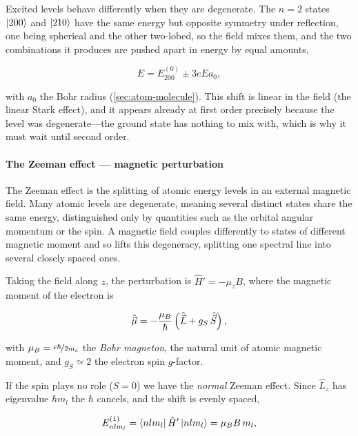     Excited levels behave differently when they are degenerate. The $n=2$ states $\ket{200}$ and $\ket{210}$ have the same energy but opposite symmetry under reflection, one being spherical and the other two-lobed, so the field mixes them, and the two combinations it produces are pushed apart in energy by equal amounts,

    \begin{equation*}
        E = E^{(0)}_{200} \pm 3eEa_{0},
    \end{equation*}

    with $a_{0}$ the Bohr radius (\cref{sec:atom-molecule}). This shift is linear in the field (the linear Stark effect), and it appears already at first order precisely because the level was degenerate---the ground state has nothing to mix with, which is why it must wait until second order.

    \paragraph{The Zeeman effect --- magnetic perturbation}\label{sec:zeeman-effect}

        The Zeeman effect is the splitting of atomic energy levels in an external magnetic field. Many atomic levels are degenerate, meaning several distinct states share the same energy, distinguished only by quantities such as the orbital angular momentum or the spin. A magnetic field couples differently to states of different magnetic moment and so lifts this degeneracy, splitting one spectral line into several closely spaced ones.

        Taking the field along $z$, the perturbation is $\hat{H}' = -\mu_z B$, where the magnetic moment of the electron is

        \begin{equation*}
            \hat{\vec{\mu}} = -\frac{\mu_{B}}{\hbar}\left(\hat{\vec{L}} + g_S\,\hat{\vec{S}}\right),
        \end{equation*}

        with $\mu_{B} = \nicefrac{e\hbar}{2m_{e}}$ the \emph{Bohr magneton}, the natural unit of atomic magnetic moment, and $g_S \simeq 2$ the electron spin $g$-factor.

        If the spin plays no role ($S=0$) we have the \emph{normal} Zeeman effect. Since $\hat{L}_z$ has eigenvalue $\hbar m_l$ the $\hbar$ cancels, and the shift is evenly spaced,

        \begin{equation*}
            E^{(1)}_{nlm_l} = \bra{nlm_l}\hat{H}'\ket{nlm_l} = \mu_{B} B\,m_l ,
        \end{equation*}

